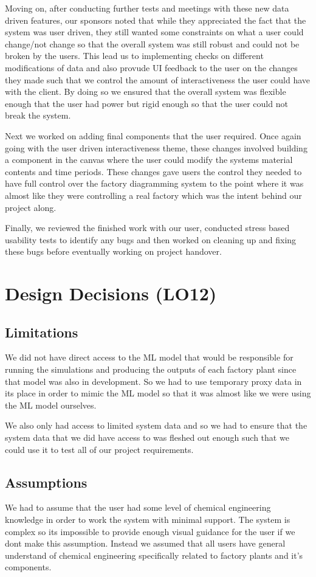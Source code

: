 \documentclass{article}
\begin{document}
Moving on, after conducting further tests and meetings with these new data driven features, our sponsors noted that while they appreciated the fact that the system was user driven, they still wanted some constraints on what a user could change/not change so that the overall system was still robust and could not be broken by the users. This lead us to implementing checks on different modifications of data and also provude UI feedback to the user on the changes they made such that we control the amount of interactiveness the user could have with the client. By doing so we ensured that the overall system was flexible enough that the user had power but rigid enough so that the user could not break the system. 

Next we worked on adding final components that the user required. Once again going with the user driven interactiveness theme, these changes involved building a component in the canvas where the user could modify the systems material contents and time periods. These changes gave users the control they needed to have full control over the factory diagramming system to the point where it was almost like they were controlling a real factory which was the intent behind our project along. 

Finally, we reviewed the finished work with our user, conducted stress based usability tests to identify any bugs and then worked on cleaning up and fixing these bugs before eventually working on project handover. 


\section{Design Decisions (LO12)}

 \subsection{Limitations}
We did not have direct access to the ML model that would be responsible for running the simulations and producing the outputs of each factory plant since that model was also in development. So we had to use temporary proxy data in its place in order to mimic the ML model so that it was almost like we were using the ML model ourselves.

We also only had access to limited system data and so we had to ensure that the system data that we did have access to was fleshed out enough such that we could use it to test all of our project requirements. 

\subsection{Assumptions}
We had to assume that the user had some level of chemical engineering knowledge in order to work the system with minimal support. The system is complex so its impossible to provide enough visual guidance for the user if we dont make this assumption. Instead we assumed that all users have general understand of chemical engineering specifically related to factory plants and it's components.
\end{document}
